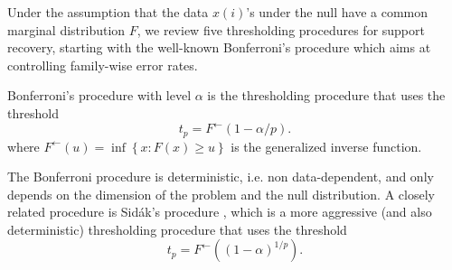 Under the assumption that the data $x(i)$'s under the null have a common marginal distribution $F$, we review five thresholding procedures for support recovery, starting with the well-known Bonferroni's procedure which aims at controlling family-wise error rates.
\begin{definition} \label{def:Bonf}
Bonferroni's procedure with level $\alpha$ is the thresholding procedure that uses the threshold
\begin{equation} \label{eq:Bonferroni-procedure}
    t_p = F^{\leftarrow}(1 - \alpha/p).
\end{equation}
where  $F^{\leftarrow}(u)=\inf{\left\{x:F(x)\ge u\right\}}$ is the generalized inverse function.
\end{definition}
The Bonferroni procedure is deterministic, i.e. non data-dependent, and only depends on the dimension of the problem and the null distribution.
A closely related procedure is Sid\'ak's procedure \citep{vsidak1967rectangular},
which is a more aggressive (and also deterministic) thresholding procedure that uses the threshold
\begin{equation} \label{eq:Sidak-procedure}
    t_p = F^{\leftarrow}((1 - \alpha)^{1/p}).
\end{equation}

